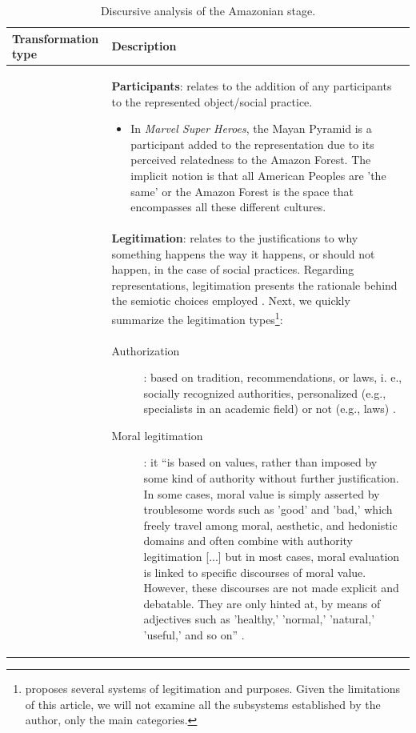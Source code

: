 \documentclass[english]{textolivre}
\begin{document}
\setlength\LTleft{-1in}\setlength\LTright{-1in}
\begin{small}
\renewcommand{\arraystretch}{1.5}
\begin{longtable}{
    >{\raggedright\arraybackslash}p{} 
    >{\raggedright\arraybackslash}p{}  
    }
\caption{Discursive analysis of the Amazonian stage.}
\label{table02}
\\
\toprule 
Transformation type & Description \\
\midrule
\multirow{4}{=}{Additive transformations} & 
\textbf{Participants}: relates to the addition of any participants to the represented object/social practice.
\begin{itemize}
    \item In \textit{Marvel Super Heroes}, the Mayan Pyramid is a participant added to the representation due to its perceived relatedness to the Amazon Forest. The implicit notion is that all American Peoples are 'the same' or the Amazon Forest is the space that encompasses all these different cultures.
\end{itemize} \\
& \textbf{Legitimation}: relates to the justifications to why something happens the way it happens, or should not happen, in the case of social practices. Regarding representations, legitimation presents the rationale behind the semiotic choices employed \cite[p. 20]{van_leeuwen_discourse_2008}. Next, we quickly summarize the legitimation types\footnote{\textcite{van_leeuwen_discourse_2008} proposes several systems of legitimation and purposes. Given the limitations of this article, we will not examine all the subsystems established by the author, only the main categories.}: 
\parfillskip=0pt \tabularnewline
&\begin{description}
    \item[Authorization]: based on tradition, recommendations, or laws, i. e., socially recognized authorities, personalized (e.g., specialists in an academic field) or not (e.g., laws) \cites[p. 105]{van_leeuwen_discourse_2008}.
    \item[Moral legitimation]: it “is based on values, rather than imposed by some kind of authority without further justification. In some cases, moral value is simply asserted by troublesome words such as 'good' and 'bad,' which freely travel among moral, aesthetic, and hedonistic domains and often combine with authority legitimation [...] but in most cases, moral evaluation is linked to specific discourses of moral value. However, these discourses are not made explicit and debatable. They are only hinted at, by means of adjectives such as 'healthy,' 'normal,' 'natural,' 'useful,' and so on” \cites[p. 109-110]{van_leeuwen_discourse_2008}.

\end{description}
\end{longtable}
\end{small}
\end{document}
